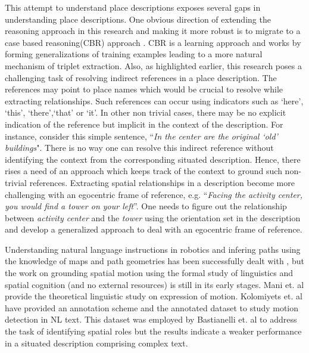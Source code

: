 \documentclass{acm_proc_article-sp}
\begin{document}
This attempt to understand place descriptions exposes several gaps in understanding place descriptions. One obvious direction of extending the reasoning approach in this research and making it more robust is to migrate to a case based reasoning(CBR) approach \cite{xu:case}. CBR is a learning approach and works by forming generalizations of training examples leading to a more natural mechanism of triplet extraction. Also, as highlighted earlier, this research poses a challenging task of resolving indirect references in a place description. The references may point to place names which would be crucial to resolve while extracting relationships. Such references can occur using indicators such as `here', `this', `there',`that' or `it'. In other non trivial cases, there may be no explicit indication of the reference but implicit in the context of the description. For instance, consider this simple sentence, ``\textit{In the center are the original `old' buildings}". There is no way one can resolve this indirect reference without identifying the context from the corresponding situated description. Hence, there rises a need of an approach which keeps track of the context to ground such non-trivial references. Extracting spatial relationships in a description become more challenging with an egocentric frame of reference, e.g. ``\textit{Facing the activity center, you would find a tower on your left}''. One needs to figure out the relationship between \textit{activity center} and the \textit{tower} using the orientation set in the description and develop a generalized approach to deal with an egocentric frame of reference.

Understanding natural language instructions in robotics and infering paths using the knowledge of maps and path geometries has been successfully dealt with \cite{kollar:robotic}, but the work on grounding spatial motion using the formal study of linguistics and spatial cognition (and no external resources) is still in its early stages. Mani et. al \cite{mani:motion} provide the theoretical linguistic study on expression of motion. Kolomiyets et. al \cite{kolomiyets:semeval} have provided an annotation scheme and the annotated dataset to study motion detection in NL text. This dataset was employed by Bastianelli et. al \cite{bastianelli:unitor} to address the task of identifying spatial roles but the results indicate a weaker performance in a situated description comprising complex text.
\end{document}
